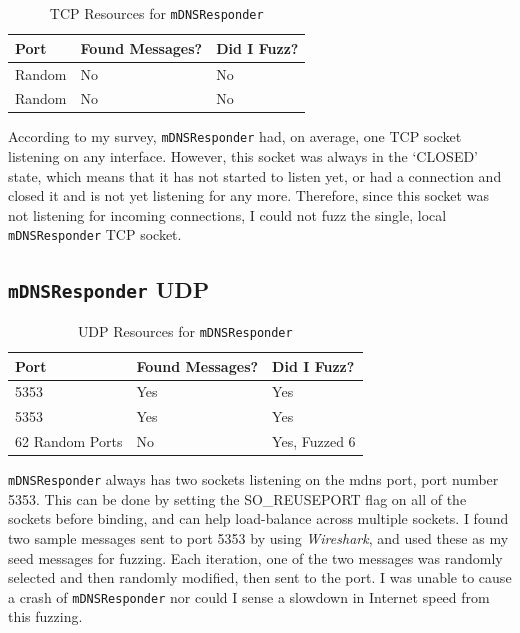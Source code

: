 \begin{table}
\centering
\begin{normalsize}
\begin{tabular}{ l | l | l }
\textbf{Port} & \textbf{Found Messages?} & \textbf{Did I Fuzz?} \\ \hline
Random & No & No \\ \hline
Random & No & No \\ \hline
\end{tabular}
\caption{TCP Resources for \texttt{mDNSResponder}}
\label{tab:mdnsTcpTab}
\end{normalsize}
\end{table} 

According to my survey, \texttt{mDNSResponder} had, on average, one TCP socket listening on any interface.  However, this socket was always in the `CLOSED' state, which means that it has not started to listen yet, or had a connection and closed it and is not yet listening for any more.  Therefore, since this socket was not listening for incoming connections, I could not fuzz the single, local \texttt{mDNSResponder} TCP socket.

\subsection{\texttt{mDNSResponder} UDP}
\label{sec:mdnsUdp}

\begin{table}
\centering
\begin{normalsize}
\begin{tabular}{ l | l | l }
\textbf{Port} & \textbf{Found Messages?} & \textbf{Did I Fuzz?} \\ \hline
5353 & Yes & Yes \\ \hline
5353 & Yes & Yes \\ \hline
62 Random Ports & No & Yes, Fuzzed 6 \\ \hline
\end{tabular}
\caption{UDP Resources for \texttt{mDNSResponder}}
\label{tab:mdnsUdpTab}
\end{normalsize}
\end{table} 

\texttt{mDNSResponder} always has two sockets listening on the mdns port, port number 5353.  This can be done by setting the SO\_REUSEPORT flag on all of the sockets before binding, and can help load-balance across multiple sockets.  I found two sample messages sent to port 5353 by using \textit{Wireshark}, and used these as my seed messages for fuzzing.  Each iteration, one of the two messages was randomly selected and then randomly modified, then sent to the port.  I was unable to cause a crash of \texttt{mDNSResponder} nor could I sense a slowdown in Internet speed from this fuzzing.

